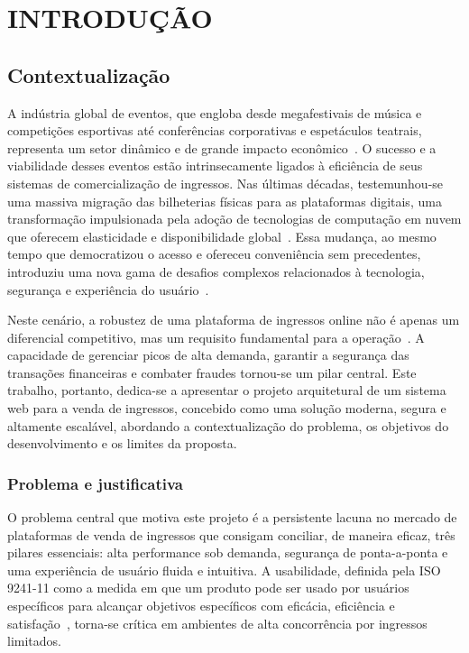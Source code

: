 \chapter{INTRODUÇÃO}

\section{Contextualização}

A indústria global de eventos, que engloba desde megafestivais de música e competições esportivas até conferências corporativas e espetáculos teatrais, representa um setor dinâmico e de grande impacto econômico~\cite{Getz:2012}. O sucesso e a viabilidade desses eventos estão intrinsecamente ligados à eficiência de seus sistemas de comercialização de ingressos. Nas últimas décadas, testemunhou-se uma massiva migração das bilheterias físicas para as plataformas digitais, uma transformação impulsionada pela adoção de tecnologias de computação em nuvem que oferecem elasticidade e disponibilidade global~\cite{MellGrance:2011}. Essa mudança, ao mesmo tempo que democratizou o acesso e ofereceu conveniência sem precedentes, introduziu uma nova gama de desafios complexos relacionados à tecnologia, segurança e experiência do usuário~\cite{Sommerville:2016}.

Neste cenário, a robustez de uma plataforma de ingressos online não é apenas um diferencial competitivo, mas um requisito fundamental para a operação~\cite{Pressman:2019}. A capacidade de gerenciar picos de alta demanda, garantir a segurança das transações financeiras e combater fraudes tornou-se um pilar central. Este trabalho, portanto, dedica-se a apresentar o projeto arquitetural de um sistema web para a venda de ingressos, concebido como uma solução moderna, segura e altamente escalável, abordando a contextualização do problema, os objetivos do desenvolvimento e os limites da proposta.

\subsection{Problema e justificativa}

O problema central que motiva este projeto é a persistente lacuna no mercado de plataformas de venda de ingressos que consigam conciliar, de maneira eficaz, três pilares essenciais: alta performance sob demanda, segurança de ponta-a-ponta e uma experiência de usuário fluida e intuitiva. A usabilidade, definida pela ISO 9241-11 como a medida em que um produto pode ser usado por usuários específicos para alcançar objetivos específicos com eficácia, eficiência e satisfação~\cite{ISO9241:2018}, torna-se crítica em ambientes de alta concorrência por ingressos limitados.

